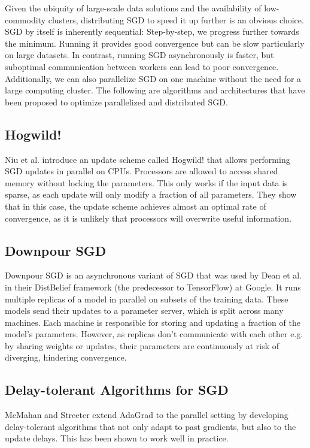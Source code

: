 \documentclass{article}
\begin{document}
Given the ubiquity of large-scale data solutions and the availability of low-commodity clusters, distributing SGD to speed it up further is an obvious choice.
SGD by itself is inherently sequential: Step-by-step, we progress further towards the minimum. Running it provides good convergence but can be slow particularly on large datasets. In contrast, running SGD asynchronously is faster, but suboptimal communication between workers can lead to poor convergence. Additionally, we can also parallelize SGD on one machine without the need for a large computing cluster. The following are algorithms and architectures that have been proposed to optimize parallelized and distributed SGD.

\subsection{Hogwild!}

Niu et al. \cite{Niu2011} introduce an update scheme called Hogwild! that allows performing SGD updates in parallel on CPUs. Processors are allowed to access shared memory without locking the parameters. This only works if the input data is sparse, as each update will only modify a fraction of all parameters. They show that in this case, the update scheme achieves almost an optimal rate of convergence, as it is unlikely that processors will overwrite useful information.

\subsection{Downpour SGD}

Downpour SGD is an asynchronous variant of SGD that was used by Dean et al. \cite{Dean2012} in their DistBelief framework (the predecessor to TensorFlow) at Google. It runs multiple replicas of a model in parallel on subsets of the training data. These models send their updates to a parameter server, which is split across many machines. Each machine is responsible for storing and updating a fraction of the model's parameters. However, as replicas don't communicate with each other e.g. by sharing weights or updates, their parameters are continuously at risk of diverging, hindering convergence.

\subsection{Delay-tolerant Algorithms for SGD}

McMahan and Streeter \cite{Mcmahan2014} extend AdaGrad to the parallel setting by developing delay-tolerant algorithms that not only adapt to past gradients, but also to the update delays. This has been shown to work well in practice.
\end{document}
